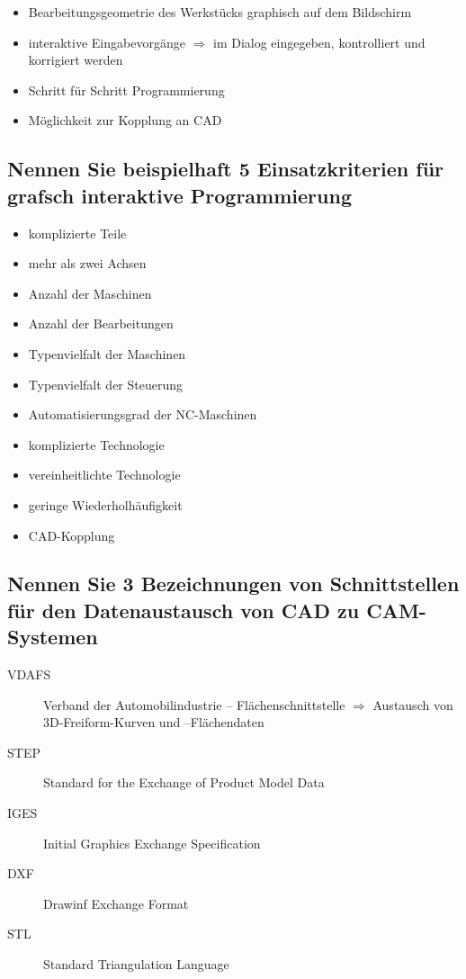 \begin{itemize}
\item Bearbeitungsgeometrie des Werkstücks graphisch auf dem Bildschirm
\item interaktive Eingabevorgänge $\Rightarrow$ im Dialog eingegeben, kontrolliert 
und korrigiert werden
\item Schritt für Schritt Programmierung
\item Möglichkeit zur Kopplung an CAD
\end{itemize}

\subsection*{Nennen Sie beispielhaft 5 Einsatzkriterien für grafsch interaktive Programmierung}

\begin{itemize}
\item komplizierte Teile 
\item mehr als zwei Achsen 
\item Anzahl der Maschinen 
\item Anzahl der Bearbeitungen 
\item Typenvielfalt der Maschinen 
\item Typenvielfalt der Steuerung 
\item Automatisierungsgrad der NC-Maschinen 
\item komplizierte Technologie
\item vereinheitlichte Technologie 
\item geringe Wiederholhäufigkeit 
\item CAD-Kopplung
\end{itemize}

\subsection*{Nennen Sie 3 Bezeichnungen von Schnittstellen für den Datenaustausch von CAD zu CAM-Systemen}

\begin{description}
    \item[VDAFS] Verband der Automobilindustrie – Flächenschnittstelle $\Rightarrow$ Austausch von 3D-Freiform-Kurven und –Flächendaten 
    \item[STEP] Standard for the Exchange of Product Model Data 
    \item[IGES] Initial Graphics Exchange Specification 
    \item[DXF] Drawinf Exchange Format 
    \item[STL] Standard Triangulation Language 
\end{description}

